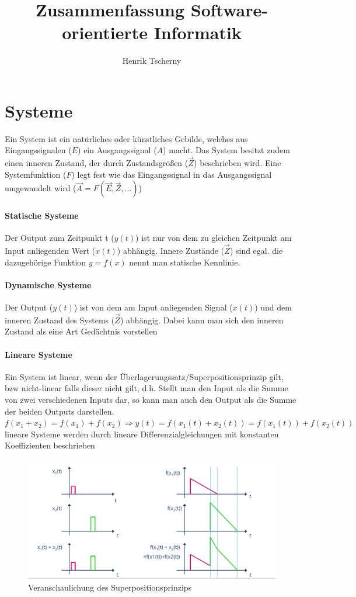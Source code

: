 \documentclass[12pt,a4paper]{article}
\title{Zusammenfassung Software-orientierte Informatik}
\author{Henrik Tscherny}
\begin{document}
\maketitle
\tableofcontents

\section{Systeme}
Ein System ist ein natürliches oder künstliches Gebilde, welches aus Eingangssignalen ($E$) ein Ausgangssignal ($A$) macht. Das System besitzt zudem einen inneren Zustand, der durch Zustandsgrößen ($\vec{Z}$) beschrieben wird. Eine Systemfunktion ($F$) legt fest wie das Eingangssignal in das Ausgangssignal umgewandelt wird ($\vec{A} = F(\vec{E}, \vec{Z},...)$)

\paragraph{Statische Systeme}
Der Output zum Zeitpunkt t ($y(t)$) ist nur von dem zu gleichen Zeitpunkt am Input anliegenden Wert ($x(t)$) abhängig. Innere Zustände ($\vec{Z}$) sind egal. die dazugehörige Funktion $y=f(x)$ nennt man statische Kennlinie.

\paragraph{Dynamische Systeme}
Der Output ($y(t)$) ist von dem am Input anliegenden Signal ($x(t)$) und dem inneren Zustand des Systems ($\vec{Z}$) abhängig. Dabei kann man sich den inneren Zustand als eine Art Gedächtnis vorstellen

\paragraph{Lineare Systeme}
Ein System ist linear, wenn der Überlagerungssatz/Superpositionsprinzip gilt, bzw nicht-linear falls dieser nicht gilt, d.h. Stellt man den Input als die Summe von zwei verschiedenen Inputs dar, so kann man auch den Output als die Summe der beiden Outputs darstellen.\\
$f(x_1 + x_2) = f(x_1) + f(x_2) \Rightarrow y(t) = f(x_1(t) + x_2(t)) = f(x_1(t)) + f(x_2(t))$\\
lineare Systeme werden durch lineare Differenzialgleichungen mit konstanten Koeffizienten beschrieben
\begin{figure}[H]
\includegraphics[scale=0.3]{./resources/linear-system.png}
\caption{Veranschaulichung des Superpositionsprinzips}
\end{figure}
\end{document}
